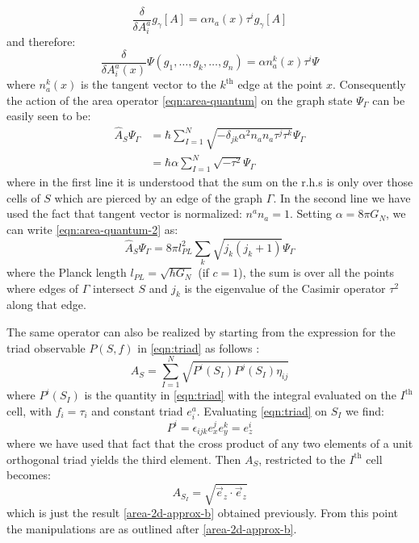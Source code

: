 \documentclass[a4paper]{article}
\begin{document}
\begin{equation}\label{eqn:edge-momentum}
	\frac{\delta}{\delta A^a_i} g_\gamma[A] = \alpha n_a (x) \tau^i g_\gamma[A]
\end{equation}
and therefore:
\begin{equation}\label{eqn:graph-momentum}
	\frac{\delta}{\delta A^a_i(x)} \Psi(g_1,\ldots,g_k,\ldots,g_n) = \alpha n_a^k(x) \tau^i \Psi
\end{equation}
where $ n_a^k(x) $ is the tangent vector to the $ k^\text{th} $ edge at the point $ x $. Consequently the action of the area operator \eqref{eqn:area-quantum} on the graph state $ \Psi_\Gamma $ can be easily seen to be:
\begin{align}\label{eqn:area-quantum-2}
	\hat A_S \Psi_\Gamma & = \hbar \sum_{I=1}^N \sqrt{-\delta_{jk} \alpha^2 n_a n_a \tau^j \tau^k } \Psi_\Gamma \nonumber \\
	& = \hbar \alpha \sum_{I=1}^N \sqrt{- \tau^2} \Psi_\Gamma
\end{align}
where in the first line it is understood that the sum on the r.h.s is only over those cells of $ S $ which are pierced by an edge of the graph $ \Gamma $. In the second line we have used the fact that tangent vector is normalized: $ n^a n_a = 1 $. Setting $ \alpha = 8 \pi G_N $, we can write \eqref{eqn:area-quantum-2} as:
\begin{equation}\label{eqn:area-quantum-3}
	\hat A_S \Psi_\Gamma = 8 \pi l_{PL}^2 \sum_k \sqrt{ j_k (j_k + 1)} \Psi_\Gamma
\end{equation}
where the Planck length $ l_{PL} = \sqrt{\hbar G_N} $ (if $ c = 1 $), the sum is over all the points where edges of $ \Gamma $ intersect $ S $ and $ j_k $ is the eigenvalue of the Casimir operator $ \tau^2 $ along that edge.

The same operator can also be realized by starting from the expression for the triad observable $ P(S,f) $ in \eqref{eqn:triad} as follows \cite[Sec 5.1.1]{Ashtekar2004Background}:
\begin{equation}\label{eqn:area-observable}
	A_S = \sum_{I=1}^{N}\sqrt{P^i(S_I) P^j(S_I) \eta_{ij}}
\end{equation}
where $ P^i(S_I) $ is the quantity in \eqref{eqn:triad} with the integral evaluated on the $ I^\text{th} $ cell, with $ f_i = \tau_i $ and constant triad $ e^a_i $. Evaluating \eqref{eqn:triad} on $ S_I $ we find:
\begin{equation}\label{eqn:triad-2}
	P^i = \epsilon_{ijk} e_x^j e_y^k = e_z^i
\end{equation}
where we have used that fact that the cross product of any two elements of a unit orthogonal triad yields the third element. Then $ A_S $, restricted to the $ I^\text{th} $ cell becomes:
\begin{equation}\label{eqn:area-2}
	A_{S_I} = \sqrt{ \vec{e}_z \cdot \vec{e}_z }
\end{equation}
which is just the result \eqref{area-2d-approx-b} obtained previously. From this point the manipulations are as outlined after \eqref{area-2d-approx-b}.
\end{document}
